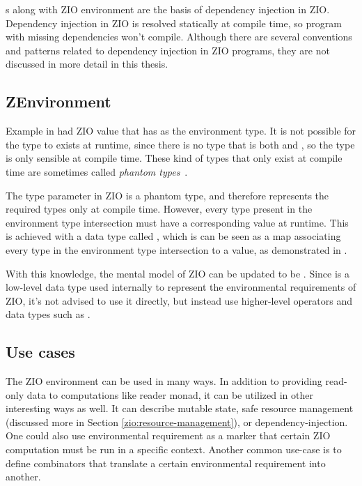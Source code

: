 

s along with ZIO environment are the basis of dependency injection in ZIO. Dependency injection in ZIO is resolved statically at compile time, so program with missing dependencies won't compile. Although there are several conventions and patterns related to dependency injection in ZIO programs, they are not discussed in more detail in this thesis.


\subsection{ZEnvironment}
Example in  had ZIO value  that has  as the environment type. It is not possible for the type to exists at runtime, since there is no type that is both  and , so the type is only sensible at compile time. These kind of types that only exist at compile time are sometimes called \textit{phantom types}~\cite{fun-phantom-types}.

The  type parameter in ZIO is a phantom type, and therefore represents the required types only at compile time. However, every type present in the environment type intersection must have a corresponding value at runtime. This is achieved with a data type called , which is can be seen as a map associating every type in the environment type intersection to a value, as demonstrated in .



With this knowledge, the mental model of ZIO can be updated to be . Since  is a low-level data type used internally to represent the environmental requirements of ZIO, it's not advised to use it directly, but instead use higher-level operators and data types such as .


\subsection{Use cases}
The ZIO environment can be used in many ways. In addition to providing read-only data to computations like reader monad, it can be utilized in other interesting ways as well. It can describe mutable state, safe resource management (discussed more in Section \ref{zio:resource-management}), or dependency-injection. One could also use environmental requirement as a marker that certain ZIO computation must be run in a specific context. Another common use-case is to define combinators that translate a certain environmental requirement into another.

